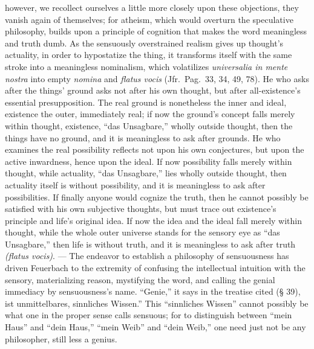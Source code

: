 \documentclass[12pt]{book}
\begin{document}
however, we recollect ourselves a little more closely upon these objections,
they vanish again of themselves; for atheism, which would overturn the
speculative philosophy, builds upon a principle of cognition that makes the
word meaningless and truth dumb. As the sensuously overstrained realism
gives up thought's actuality, in order to hypostatize the thing, it
transforms itself with the same stroke into a meaningless nominalism, which
volatilizes \textit{universalia in mente nostra} into empty \textit{nomina}
and \textit{flatus vocis} (Jfr.\ Pag.\ 33, 34, 49, 78). He who asks after
the things' ground asks not after his own thought, but after all-existence's
essential presupposition. The real ground is nonetheless the inner and
ideal, existence the outer, immediately real; if now the ground's concept
falls merely within thought, existence, ``das Unsagbare,'' wholly outside
thought, then the things have no ground, and it is meaningless to ask after
grounds. He who examines the real possibility reflects not upon his own
conjectures, but upon the active inwardness, hence upon the ideal. If now
possibility falls merely within thought, while actuality, ``das
Unsagbare,'' lies wholly outside thought, then actuality itself is without
possibility, and it is meaningless to ask after possibilities. If finally
anyone would cognize the truth, then he cannot possibly be satisfied with
his own subjective thoughts, but must trace out existence's principle and
life's original idea. If now the idea and the ideal fall merely within
thought, while the whole outer universe stands for the sensory eye as ``das
Unsagbare,'' then life is without truth, and it is meaningless to ask after
truth \textit{(flatus vocis)}. --- The endeavor to establish a philosophy of
sensuousness has driven Feuerbach to the extremity of confusing the
intellectual intuition with the sensory, materializing reason, mystifying
the word, and calling the genial immediacy by sensuousness's name.
``Genie,'' it says in the treatise cited (§ 39), ist unmittelbares,
sinnliches Wissen.'' This ``sinnliches Wissen'' cannot possibly be what one
in the proper sense calls sensuous; for to distinguish between ``mein
Haus'' and ``dein Haus,'' ``mein Weib'' and ``dein Weib,'' one need just not
be any philosopher, still less a genius.
\end{document}

